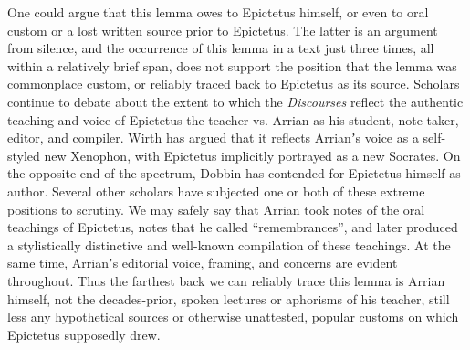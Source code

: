 One could argue that this lemma owes to Epictetus himself, %
or even to oral custom or a lost written source prior to Epictetus. %
The latter is an argument from silence, %
and the occurrence of this lemma in a text just three times, %
all within a relatively brief span, %
does not support the position that the lemma was commonplace custom, %
or reliably traced back to Epictetus as its source. %
Scholars continue to debate about the extent to which the \textit{Discourses} %
reflect the authentic teaching and voice of Epictetus the teacher %
vs. Arrian as his student, note-taker, editor, and compiler. %
Wirth has argued that it reflects Arrianʼs voice as a self-styled %
new Xenophon, with Epictetus implicitly portrayed as a new Socrates. %
On the opposite end of the spectrum, Dobbin has contended for %
Epictetus himself as author. %
Several other scholars have subjected one or both of these extreme positions %
to scrutiny. %
We may safely say that Arrian took notes of the oral teachings of Epictetus, %
notes that he called “remembrances”, %
and later produced a stylistically distinctive %
and well-known compilation of these teachings. %
At the same time, Arrianʼs editorial voice, framing, and concerns %
are evident throughout. %
Thus the farthest back we can reliably trace this lemma is Arrian himself, %
not the decades-prior, spoken lectures or aphorisms of his teacher, %
still less any hypothetical sources or otherwise unattested, popular customs on which Epictetus supposedly drew. %
